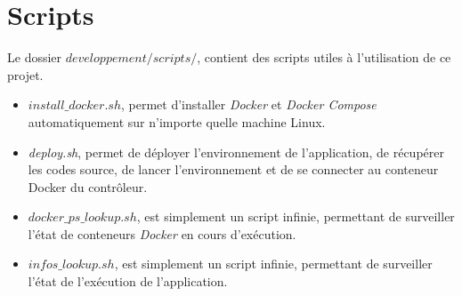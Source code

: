 \section{Scripts}

Le dossier \emph{$developpement/scripts/$}, contient des scripts utiles à l'utilisation de ce projet.

\begin{itemize}
\item \emph{$install\_docker.sh$}, permet d'installer \emph{Docker} et \emph{Docker Compose} automatiquement sur n'importe quelle machine Linux.
\item \emph{deploy.sh}, permet de déployer l'environnement de l'application, de récupérer les codes source, de lancer l'environnement et de se connecter au conteneur Docker du contrôleur.
\item \emph{$docker\_ps\_lookup.sh$}, est simplement un script infinie, permettant de surveiller l'état de conteneurs \emph{Docker} en cours d'exécution.
\item \emph{$infos\_lookup.sh$}, est simplement un script infinie, permettant de surveiller l'état de l'exécution de l'application.
\end{itemize}




























